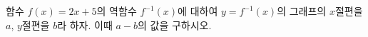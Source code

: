 \hspace*{2mm}\begin{minipage}[t]{\dimexpr\linewidth-2mm\relax}\vspace{0pt}
함수 $f(x)=2x+5$의 역함수 $f^{-1}(x)$에 대하여 $y=f^{-1}(x)$의 그래프의 $x$절편을 $a$, $y$절편을 $b$라 하자. 이때 $a-b$의 값을 구하시오.\end{minipage}
